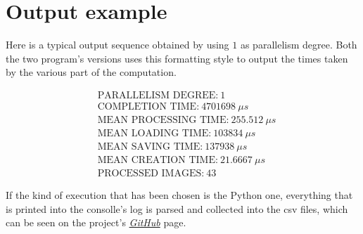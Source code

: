     \section{Output example} %
    \label{sec:output_example}
        Here is a typical output sequence obtained by using $1$ as parallelism degree. Both the two program's
        versions uses this formatting style to output the times taken by the various part of the computation.

        \begin{align*}
            &\text{PARALLELISM DEGREE:} \ 1 \\
            &\text{COMPLETION TIME:} \ 4701698 \ \mu s \\
            &\text{MEAN PROCESSING TIME:} \ 255.512 \ \mu s \\
            &\text{MEAN LOADING TIME:} \ 103834 \ \mu s \\
            &\text{MEAN SAVING TIME:} \ 137938 \ \mu s \\
            &\text{MEAN CREATION TIME:} \ 21.6667 \ \mu s \\
            &\text{PROCESSED IMAGES:} \ 43
        \end{align*}

        If the kind of execution that has been chosen is the Python one, everything that is printed into the
        consolle's log is parsed and collected into the csv files, which can be seen on the project's
        \href{https://github.com/germz01/PDS_project}{\textit{GitHub}} page.
